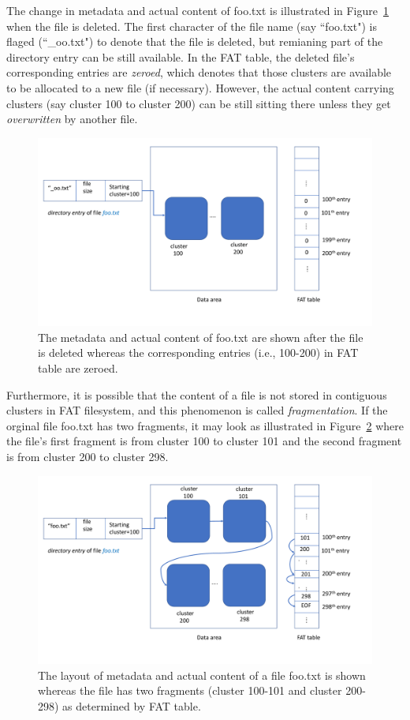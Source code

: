 The change in metadata and actual content of foo.txt is illustrated in Figure~\ref{fig:fat2} when the file is deleted.
The first character of the file name (say ``foo.txt") is flaged (``\_oo.txt") to denote that the file is deleted, 
but remianing part of the directory entry can be still available. In the FAT table, the deleted file's corresponding
entries are \emph{zeroed}, which denotes that those clusters are available to be allocated to a new file (if necessary).
However, the actual content carrying clusters (say cluster 100 to cluster 200)
can be still sitting there unless they get \emph{overwritten} by another file. 
  
\begin{figure}[h]
    \centering
    \includegraphics[width=\linewidth]{fig/fat2.pdf}
    \caption{The metadata and actual content of foo.txt are shown after the file is deleted whereas the corresponding entries (i.e., 100-200) in FAT table are zeroed.}
    \label{fig:fat2}
\end{figure}

Furthermore, it is possible that the content of a file is not stored in contiguous clusters in FAT filesystem, 
and this phenomenon is called \emph{fragmentation}.
If the orginal file foo.txt has two fragments, it may look as illustrated in Figure~\ref{fig:fat3} where the file's first fragment is from cluster 100 to cluster 101 and the 
second fragment is from cluster 200 to cluster 298. 

\begin{figure}[h]
    \centering
    \includegraphics[width=\linewidth]{fig/fat3.pdf}
    \caption{The layout of metadata and actual content of a file foo.txt is shown whereas the file has two fragments (cluster 100-101 and cluster 200-298) 
as determined by FAT table.}
    \label{fig:fat3}
\end{figure}
